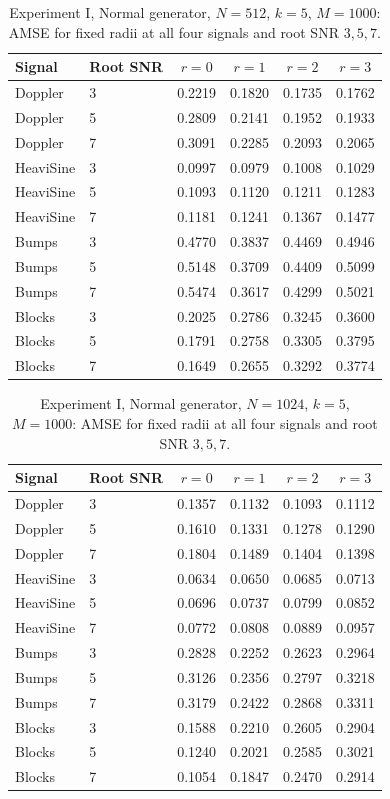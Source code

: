 \documentclass[11pt]{article}
\numberwithin{equation}{section}
\begin{document}
\begin{table}[H]
\centering\small
\caption{Experiment I, Normal generator, $N=512$, $k=5$, $M=1000$: AMSE for fixed radii at all four signals and root SNR $3,5,7$.}
\label{tab:s5-e1-normal-512}
\setlength{\tabcolsep}{5pt}
\begin{tabular}{llcccc}
\toprule
Signal & Root SNR & $r=0$ & $r=1$ & $r=2$ & $r=3$ \\
\midrule
Doppler & 3 & 0.2219 & 0.1820 & 0.1735 & 0.1762 \\
Doppler & 5 & 0.2809 & 0.2141 & 0.1952 & 0.1933 \\
Doppler & 7 & 0.3091 & 0.2285 & 0.2093 & 0.2065 \\
HeaviSine & 3 & 0.0997 & 0.0979 & 0.1008 & 0.1029 \\
HeaviSine & 5 & 0.1093 & 0.1120 & 0.1211 & 0.1283 \\
HeaviSine & 7 & 0.1181 & 0.1241 & 0.1367 & 0.1477 \\
Bumps & 3 & 0.4770 & 0.3837 & 0.4469 & 0.4946 \\
Bumps & 5 & 0.5148 & 0.3709 & 0.4409 & 0.5099 \\
Bumps & 7 & 0.5474 & 0.3617 & 0.4299 & 0.5021 \\
Blocks & 3 & 0.2025 & 0.2786 & 0.3245 & 0.3600 \\
Blocks & 5 & 0.1791 & 0.2758 & 0.3305 & 0.3795 \\
Blocks & 7 & 0.1649 & 0.2655 & 0.3292 & 0.3774 \\
\bottomrule
\end{tabular}
\end{table}

\begin{table}[H]
\centering\small
\caption{Experiment I, Normal generator, $N=1024$, $k=5$, $M=1000$: AMSE for fixed radii at all four signals and root SNR $3,5,7$.}
\label{tab:s5-e1-normal-1024}
\setlength{\tabcolsep}{5pt}
\begin{tabular}{llcccc}
\toprule
Signal & Root SNR & $r=0$ & $r=1$ & $r=2$ & $r=3$ \\
\midrule
Doppler & 3 & 0.1357 & 0.1132 & 0.1093 & 0.1112 \\
Doppler & 5 & 0.1610 & 0.1331 & 0.1278 & 0.1290 \\
Doppler & 7 & 0.1804 & 0.1489 & 0.1404 & 0.1398 \\
HeaviSine & 3 & 0.0634 & 0.0650 & 0.0685 & 0.0713 \\
HeaviSine & 5 & 0.0696 & 0.0737 & 0.0799 & 0.0852 \\
HeaviSine & 7 & 0.0772 & 0.0808 & 0.0889 & 0.0957 \\
Bumps & 3 & 0.2828 & 0.2252 & 0.2623 & 0.2964 \\
Bumps & 5 & 0.3126 & 0.2356 & 0.2797 & 0.3218 \\
Bumps & 7 & 0.3179 & 0.2422 & 0.2868 & 0.3311 \\
Blocks & 3 & 0.1588 & 0.2210 & 0.2605 & 0.2904 \\
Blocks & 5 & 0.1240 & 0.2021 & 0.2585 & 0.3021 \\
Blocks & 7 & 0.1054 & 0.1847 & 0.2470 & 0.2914 \\
\bottomrule
\end{tabular}
\end{table}
\end{document}
